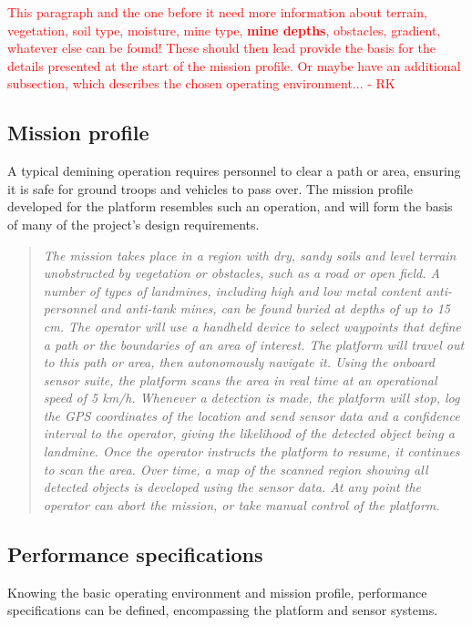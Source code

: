 \documentclass[main.tex]{subfiles}
\begin{document}
\textcolor{red}{This paragraph and the one before it need more information about terrain, vegetation, soil type, moisture, mine type, \textbf{mine depths}, obstacles, gradient, whatever else can be found! These should then lead provide the basis for the details presented at the start of the mission profile. Or maybe have an additional subsection, which describes the chosen operating environment... - RK}

\subsection{Mission profile}
A typical demining operation requires personnel to clear a path or area, ensuring it is safe for ground troops and vehicles to pass over. The mission profile developed for the platform resembles such an operation, and will form the basis of many of the project's design requirements.
\begin{quote}\textit{The mission takes place in a region with dry, sandy soils and level terrain unobstructed by vegetation or obstacles, such as a road or open field. A number of types of landmines, including high and low metal content anti-personnel and anti-tank mines, can be found buried at depths of up to 15 cm. The operator will use a handheld device to select waypoints that define a path or the boundaries of an area of interest. The platform will travel out to this path or area, then autonomously navigate it. Using the onboard sensor suite, the platform scans the area in real time at an operational speed of 5 km/h. Whenever a detection is made, the platform will stop, log the GPS coordinates of the location  and send sensor data and a confidence interval to the operator, giving the likelihood of the detected object being a landmine. Once the operator instructs the platform to resume, it continues to scan the area. Over time, a map of the scanned region showing all detected objects is developed using the sensor data. At any point the operator can abort the mission, or take manual control of the platform.}
\end{quote}

\subsection{Performance specifications}
Knowing the basic operating environment and mission profile, performance specifications can be defined, encompassing the platform and sensor systems.
\end{document}
